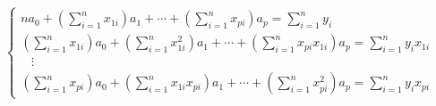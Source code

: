 \documentclass[dvipdfmx]{jsarticle}
\begin{document}
\begin{equation}
  \begin{cases}
    \displaystyle
    na_0+\left(\sum_{i=1}^n x_{1i}\right)a_1+\cdots+\left(\sum_{i=1}^n x_{pi}\right)a_p=\sum_{i=1}^ny_i                                                & \\
    \displaystyle
    \left(\sum_{i=1}^n x_{1i}\right)a_0+\left(\sum_{i=1}^n x_{1i}^2\right)a_1+\cdots+\left(\sum_{i=1}^n x_{pi}x_{1i}\right)a_p=\sum_{i=1}^ny_i x_{1i}  & \\
    \displaystyle
    \; \; \; \vdots                                                                                                                                      \\
    \displaystyle
    \left(\sum_{i=1}^n x_{pi}\right)a_0+\left(\sum_{i=1}^n x_{1i}x_{pi}\right)a_1+\cdots+\left(\sum_{i=1}^n x_{pi}^2\right)a_p=\sum_{i=1}^ny_i x_{pi} &
    \tag{7}
  \end{cases}
\end{equation}
\end{document}

